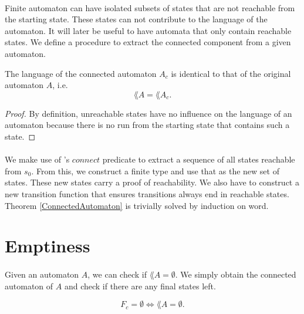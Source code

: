 \documentclass[11pt,a4paper,oneside]{book}
\begin{document}
            \paragraph{} 
                Finite automaton can have isolated subsets of states that are not reachable from the starting state. 
                These states can not contribute to the language of the automaton. 
                It will later be useful to have automata that only contain reachable states. 
                We define a procedure to extract the connected component from a given automaton.

            \begin{theorem}
                \label{ConnectedAutomaton}
                The language of the connected automaton $A_c$ is identical to that of the original automaton $A$, i.e.
                \[
                    \lang{A} = \lang{A_c}.
                \]
            \end{theorem}
            
            \begin{proof}
                By definition, unreachable states have no influence on the language of an automaton because there is no run from the starting state that contains such a state.
            \end{proof}

            \paragraph{}
                We make use of \ssreflect's $connect$ predicate to extract a sequence of all states reachable from $s_0$. 
                From this, we construct a finite type and use that as the new set of states. 
                These new states carry a proof of reachability.
                We also have to construct a new transition function that ensures transitions always end in reachable states.
                Theorem \ref{ConnectedAutomaton} is trivially solved by induction on word.


        \section{Emptiness}
            \paragraph{}
                Given an automaton $A$, we can check if $\lang{A} = \emptyset$. We simply obtain the connected automaton of $A$ and check if there are any final states left. 
                \begin{theorem} 
                    \label{AutomatonEmpty}
                    \[
                        F_c = \emptyset \Longleftrightarrow \lang{A} = \emptyset.
                    \]
                \end{theorem}
\end{document}
